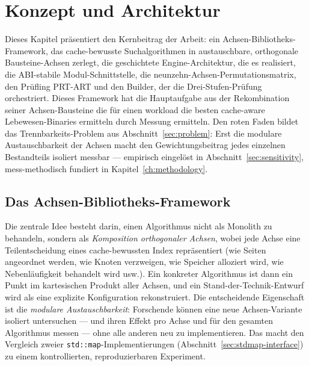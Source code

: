 \chapter{Konzept und Architektur}\label{ch:concept}

Dieses Kapitel präsentiert den Kernbeitrag der Arbeit: ein Achsen-Bibliotheks-Framework, das
cache-bewusste Suchalgorithmen in austauschbare, orthogonale Bausteine-Achsen zerlegt, die
geschichtete Engine-Architektur, die es realisiert, die ABI-stabile Modul-Schnittstelle, die
neunzehn-Achsen-Permutationsmatrix, den Prüfling PRT-ART und den Builder, der die
Drei-Stufen-Prüfung orchestriert. Dieses Framework hat die Hauptaufgabe aus der Rekombination
seiner Achsen-Bausteine die für einen workload die besten cache-aware Lebewesen-Binaries
ermitteln durch Messung ermitteln. Den roten Faden bildet das Trennbarkeits-Problem aus
Abschnitt~\ref{sec:problem}: Erst die modulare Austauschbarkeit der Achsen macht den
Gewichtungsbeitrag jedes einzelnen Bestandteils isoliert messbar --- empirisch eingelöst in
Abschnitt~\ref{sec:sensitivity}, mess-methodisch fundiert in Kapitel~\ref{ch:methodology}.

\section{Das Achsen-Bibliotheks-Framework}\label{sec:axis-framework}

Die zentrale Idee besteht darin, einen Algorithmus nicht als Monolith zu behandeln, sondern als
\emph{Komposition orthogonaler Achsen}, wobei jede Achse eine Teilentscheidung eines cache-bewussten
Index repräsentiert (wie Seiten angeordnet werden, wie Knoten verzweigen, wie Speicher alloziert
wird, wie Nebenläufigkeit behandelt wird usw.). Ein konkreter Algorithmus ist dann ein Punkt im
kartesischen Produkt aller Achsen, und ein Stand-der-Technik-Entwurf wird als eine explizite
Konfiguration rekonstruiert. Die entscheidende Eigenschaft ist die \emph{modulare Austauschbarkeit}:
Forschende können eine neue Achsen-Variante isoliert untersuchen --- und ihren Effekt pro Achse und
für den gesamten Algorithmus messen --- ohne alle anderen neu zu implementieren. Das macht den
Vergleich zweier \texttt{std::map}-Implementierungen (Abschnitt~\ref{sec:stdmap-interface}) zu einem
kontrollierten, reproduzierbaren Experiment.

